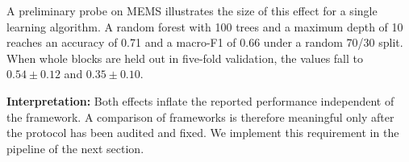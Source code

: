 A preliminary probe on MEMS illustrates the size of this effect for a single learning algorithm. A random forest with 100 trees and a maximum depth of 10 reaches an accuracy of 0.71 and a macro-F1 of 0.66 under a random 70/30 split. When whole blocks are held out in five-fold validation, the values fall to $0.54\pm0.12$ and $0.35\pm0.10$.

\textbf{Interpretation:} Both effects inflate the reported performance independent of the framework. A comparison of frameworks is therefore meaningful only after the protocol has been audited and fixed. We implement this requirement in the pipeline of the next section.

